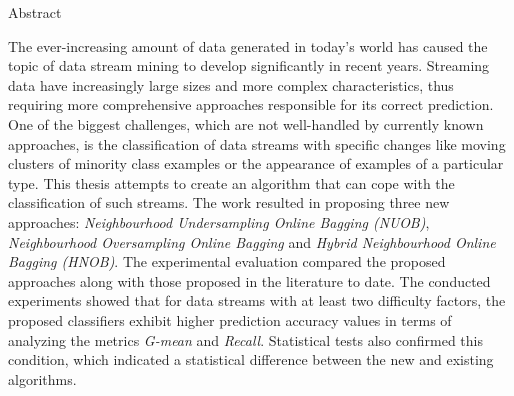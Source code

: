 \documentclass[polish,master,a4paper,oneside,11pt]{ppfcmthesis}
\begin{document}
\begin{center}
    \huge Abstract
\end{center}
The ever-increasing amount of data generated in today's world has caused the topic of data stream mining to develop significantly in recent years. Streaming data have increasingly large sizes and more complex characteristics, thus requiring more comprehensive approaches responsible for its correct prediction. One of the biggest challenges, which are not well-handled by currently known approaches, is the classification of data streams with specific changes like moving clusters of minority class examples or the appearance of examples of a particular type. This thesis attempts to create an algorithm that can cope with the classification of such streams. The work resulted in proposing three new approaches: \textit{Neighbourhood Undersampling Online Bagging (NUOB)}, \textit{Neighbourhood Oversampling Online Bagging} and \textit{Hybrid Neighbourhood Online Bagging (HNOB)}. The experimental evaluation compared the proposed approaches along with those proposed in the literature to date. The conducted experiments showed that for data streams with at least two difficulty factors, the proposed classifiers exhibit higher prediction accuracy values in terms of analyzing the metrics \textit{G-mean} and \textit{Recall}. Statistical tests also confirmed this condition, which indicated a statistical difference between the new and existing algorithms.


\newpage\null\thispagestyle{empty}\newpage
\newpage
{}\pagestyle{ppfcmthesis}%
\tableofcontents* 
\cleardoublepage %


\mainmatter%









{\raggedright\sloppy\small}


\cleardoublepage\appendix%
\newpage



\newpage\null\thispagestyle{empty}\newpage

\ppcolophon
\end{document}

